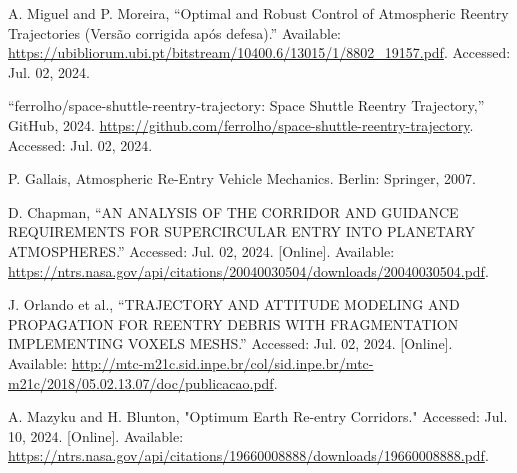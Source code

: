 \documentclass[runningheads]{llncs}
\begin{document}
\begin{thebibliography}{10}
A. Miguel and P. Moreira, “Optimal and Robust Control of Atmospheric Reentry Trajectories (Versão corrigida após defesa).” Available: \url{https://ubibliorum.ubi.pt/bitstream/10400.6/13015/1/8802\_19157.pdf}. Accessed: Jul. 02, 2024.

“ferrolho/space-shuttle-reentry-trajectory: Space Shuttle Reentry Trajectory,” GitHub, 2024. \url{https://github.com/ferrolho/space-shuttle-reentry-trajectory}. Accessed: Jul. 02, 2024.

P. Gallais, Atmospheric Re-Entry Vehicle Mechanics. Berlin: Springer, 2007.

D. Chapman, “AN ANALYSIS OF THE CORRIDOR AND GUIDANCE REQUIREMENTS FOR SUPERCIRCULAR ENTRY INTO PLANETARY ATMOSPHERES.” Accessed: Jul. 02, 2024. [Online]. Available: \url{https://ntrs.nasa.gov/api/citations/20040030504/downloads/20040030504.pdf}.

J. Orlando et al., “TRAJECTORY AND ATTITUDE MODELING AND PROPAGATION FOR REENTRY DEBRIS WITH FRAGMENTATION IMPLEMENTING VOXELS MESHS.” Accessed: Jul. 02, 2024. [Online]. Available: \url{http://mtc-m21c.sid.inpe.br/col/sid.inpe.br/mtc-m21c/2018/05.02.13.07/doc/publicacao.pdf}.

A. Mazyku and H. Blunton, "Optimum Earth Re-entry Corridors." Accessed: Jul. 10, 2024. [Online]. Available: \url{https://ntrs.nasa.gov/api/citations/19660008888/downloads/19660008888.pdf}.
‌
\end{thebibliography}
\end{document}
